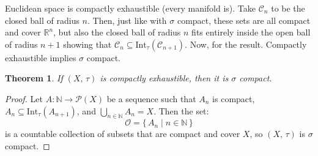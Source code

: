 \documentclass{article}
\theoremstyle{plain}
\newtheorem{theorem}{Theorem}[section]
\theoremstyle{normal}
\begin{document}
        Euclidean space is compactly exhaustible (every manifold is).
        Take $\mathcal{C}_{n}$ to be the closed ball of radius $n$. Then, just
        like with $\sigma$ compact, these sets are all compact and cover
        $\mathbb{R}^{n}$, but also the closed ball of radius $n$ fits entirely
        inside the open ball of radius $n+1$ showing that
        $\mathcal{C}_{n}\subseteq\textrm{Int}_{\tau}(\mathcal{C}_{n+1})$.
        Now, for the result. Compactly exhaustible implies $\sigma$ compact. 
        \begin{theorem}
            If $(X,\,\tau)$ is compactly exhaustible, then it is
            $\sigma$ compact.
        \end{theorem}
        \begin{proof}
            Let $A:\mathbb{N}\rightarrow\mathcal{P}(X)$ be a sequence such that
            $A_{n}$ is compact, $A_{n}\subseteq\textrm{Int}_{\tau}(A_{n+1})$,
            and $\bigcup_{n\in\mathbb{N}}A_{n}=X$. Then the set:
            \begin{equation}
                \mathcal{O}=
                \{\,A_{n}\;|\;n\in\mathbb{N}\,\}
            \end{equation}
            is a countable collection of subsets that are compact and cover
            $X$, so $(X,\,\tau)$ is $\sigma$ compact.
        \end{proof}
\end{document}
